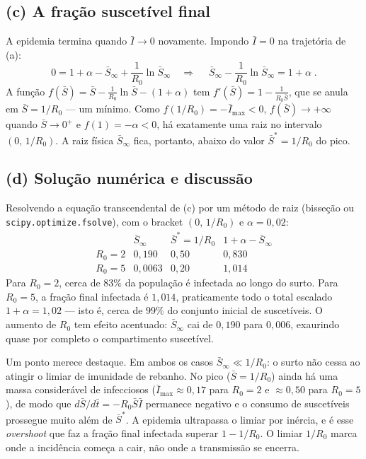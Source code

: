 \documentclass{article}
\begin{document}
\subsection*{(c) A fração suscetível final}

A epidemia termina quando $\bar I\to 0$ novamente. Impondo $\bar I=0$ na trajetória de (a):
\[
0 = 1 + \alpha - \bar S_\infty + \frac{1}{R_0}\ln\bar S_\infty
\quad\Longrightarrow\quad
\boxed{\;\bar S_\infty - \frac{1}{R_0}\ln\bar S_\infty = 1 + \alpha\;}.
\]
A função $f(\bar S)=\bar S - \tfrac{1}{R_0}\ln\bar S - (1+\alpha)$ tem $f'(\bar S)=1-\tfrac{1}{R_0\bar S}$, que se anula em $\bar S=1/R_0$ --- um mínimo. Como $f(1/R_0)=-\bar I_{\max}<0$, $f(\bar S)\to+\infty$ quando $\bar S\to 0^+$ e $f(1)=-\alpha<0$, há exatamente uma raiz no intervalo $(0,\,1/R_0)$. A raiz física $\bar S_\infty$ fica, portanto, abaixo do valor $\bar S^*=1/R_0$ do pico.

\subsection*{(d) Solução numérica e discussão}

Resolvendo a equação transcendental de (c) por um método de raiz (bisseção ou \texttt{scipy.optimize.fsolve}), com o bracket $(0,\,1/R_0)$ e $\alpha=0{,}02$:
\[
\begin{array}{lccc}
 & \bar S_\infty & \bar S^*=1/R_0 & 1+\alpha-\bar S_\infty \\[2pt]
R_0 = 2 & 0{,}190 & 0{,}50 & 0{,}830 \\
R_0 = 5 & 0{,}0063 & 0{,}20 & 1{,}014
\end{array}
\]
Para $R_0=2$, cerca de $83\%$ da população é infectada ao longo do surto. Para $R_0=5$, a fração final infectada é $1{,}014$, praticamente todo o total escalado $1+\alpha=1{,}02$ --- isto é, cerca de $99\%$ do conjunto inicial de suscetíveis. O aumento de $R_0$ tem efeito acentuado: $\bar S_\infty$ cai de $0{,}190$ para $0{,}006$, exaurindo quase por completo o compartimento suscetível.

Um ponto merece destaque. Em ambos os casos $\bar S_\infty \ll 1/R_0$: o surto não cessa ao atingir o limiar de imunidade de rebanho. No pico ($\bar S=1/R_0$) ainda há uma massa considerável de infecciosos ($\bar I_{\max}\approx 0{,}17$ para $R_0=2$ e $\approx 0{,}50$ para $R_0=5$), de modo que $d\bar S/d\bar t = -R_0\bar S\bar I$ permanece negativo e o consumo de suscetíveis prossegue muito além de $\bar S^*$. A epidemia ultrapassa o limiar por inércia, e é esse \emph{overshoot} que faz a fração final infectada superar $1-1/R_0$. O limiar $1/R_0$ marca onde a incidência começa a cair, não onde a transmissão se encerra.
\end{document}
